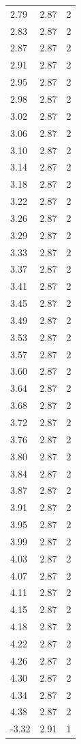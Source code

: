 \begin{longtable}{lrr}
  2.79 & 2.87 & 2 \\
  2.83 & 2.87 & 2 \\
  2.87 & 2.87 & 2 \\
  2.91 & 2.87 & 2 \\
  2.95 & 2.87 & 2 \\
  2.98 & 2.87 & 2 \\
  3.02 & 2.87 & 2 \\
  3.06 & 2.87 & 2 \\
  3.10 & 2.87 & 2 \\
  3.14 & 2.87 & 2 \\
  3.18 & 2.87 & 2 \\
  3.22 & 2.87 & 2 \\
  3.26 & 2.87 & 2 \\
  3.29 & 2.87 & 2 \\
  3.33 & 2.87 & 2 \\
  3.37 & 2.87 & 2 \\
  3.41 & 2.87 & 2 \\
  3.45 & 2.87 & 2 \\
  3.49 & 2.87 & 2 \\
  3.53 & 2.87 & 2 \\
  3.57 & 2.87 & 2 \\
  3.60 & 2.87 & 2 \\
  3.64 & 2.87 & 2 \\
  3.68 & 2.87 & 2 \\
  3.72 & 2.87 & 2 \\
  3.76 & 2.87 & 2 \\
  3.80 & 2.87 & 2 \\
  3.84 & 2.87 & 2 \\
  3.87 & 2.87 & 2 \\
  3.91 & 2.87 & 2 \\
  3.95 & 2.87 & 2 \\
  3.99 & 2.87 & 2 \\
  4.03 & 2.87 & 2 \\
  4.07 & 2.87 & 2 \\
  4.11 & 2.87 & 2 \\
  4.15 & 2.87 & 2 \\
  4.18 & 2.87 & 2 \\
  4.22 & 2.87 & 2 \\
  4.26 & 2.87 & 2 \\
  4.30 & 2.87 & 2 \\
  4.34 & 2.87 & 2 \\
  4.38 & 2.87 & 2 \\
  -3.32 & 2.91 & 1 \\

\end{longtable}
